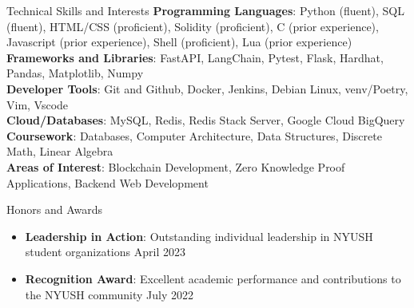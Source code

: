 \documentclass{cv} %
\begin{document}
\begin{rSection}{Technical Skills and Interests}
	\textbf{Programming Languages}{: Python (fluent), SQL (fluent), HTML/CSS (proficient), Solidity (proficient), C (prior experience),  Javascript (prior experience), Shell  (proficient), Lua (prior experience)} \\
	\textbf{Frameworks and Libraries}{: FastAPI, LangChain, Pytest, Flask, Hardhat, Pandas, Matplotlib, Numpy} \\
	\textbf{Developer Tools}{: Git and Github, Docker, Jenkins, Debian Linux, venv/Poetry, Vim, Vscode} \\
	\textbf{Cloud/Databases}{: MySQL, Redis, Redis Stack Server, Google Cloud BigQuery} \\
	\textbf{Coursework}{: Databases, Computer Architecture, Data Structures, Discrete Math, Linear Algebra} \\
	\textbf{Areas of Interest}{: Blockchain Development, Zero Knowledge Proof Applications, Backend Web Development}
\end{rSection}

\begin{rSection}{Honors and Awards}
	\begin{itemize}
		\item \textbf{Leadership in Action}{: Outstanding individual leadership in NYUSH student organizations} \hfill April 2023
		\item \textbf{Recognition Award}{: Excellent academic performance and contributions to the NYUSH community} \hfill July 2022
	\end{itemize}
\end{rSection}
\end{document}
